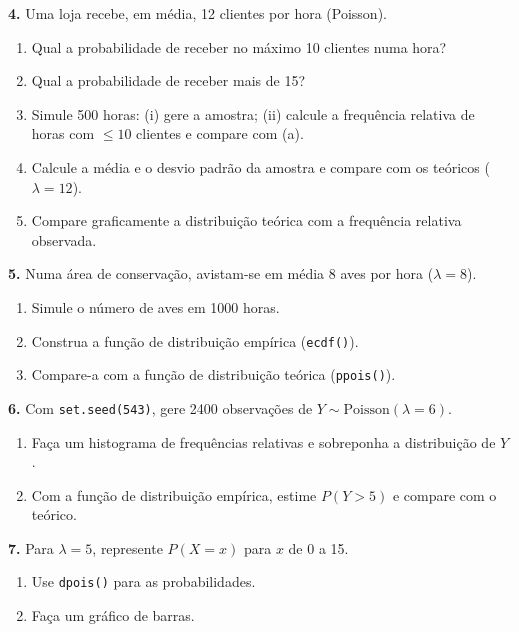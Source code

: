 \documentclass[
  portuguese,
  11pt,
  openany]{book}
\providecommand{\tightlist}{%
  \setlength{\itemsep}{0pt}\setlength{\parskip}{0pt}}
\begin{document}
\textbf{4.} Uma loja recebe, em média, 12 clientes por hora (Poisson).

\begin{enumerate}
\def\labelenumi{(\alph{enumi})}
\tightlist
\item
  Qual a probabilidade de receber no máximo 10 clientes numa hora?
\item
  Qual a probabilidade de receber mais de 15?
\item
  Simule 500 horas: (i) gere a amostra; (ii) calcule a frequência relativa de horas
  com \(\leq 10\) clientes e compare com (a).
\item
  Calcule a média e o desvio padrão da amostra e compare com os teóricos (\(\lambda = 12\)).
\item
  Compare graficamente a distribuição teórica com a frequência relativa observada.
\end{enumerate}

\textbf{5.} Numa área de conservação, avistam-se em média 8 aves por hora (\(\lambda = 8\)).

\begin{enumerate}
\def\labelenumi{(\alph{enumi})}
\tightlist
\item
  Simule o número de aves em 1000 horas.
\item
  Construa a função de distribuição empírica (\texttt{ecdf()}).
\item
  Compare-a com a função de distribuição teórica (\texttt{ppois()}).
\end{enumerate}

\textbf{6.} Com \texttt{set.seed(543)}, gere 2400 observações de \(Y \sim \text{Poisson}(\lambda = 6)\).

\begin{enumerate}
\def\labelenumi{(\alph{enumi})}
\tightlist
\item
  Faça um histograma de frequências relativas e sobreponha a distribuição de \(Y\).
\item
  Com a função de distribuição empírica, estime \(P(Y > 5)\) e compare com o teórico.
\end{enumerate}

\textbf{7.} Para \(\lambda = 5\), represente \(P(X = x)\) para \(x\) de 0 a 15.

\begin{enumerate}
\def\labelenumi{(\alph{enumi})}
\tightlist
\item
  Use \texttt{dpois()} para as probabilidades.
\item
  Faça um gráfico de barras.
\end{enumerate}
\end{document}
